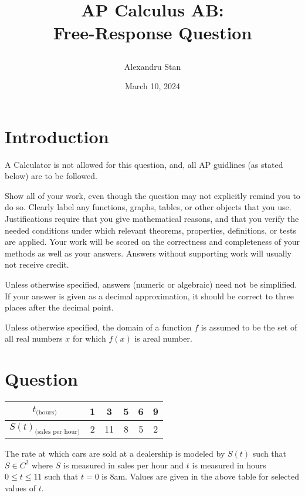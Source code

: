 \documentclass{article}
\title{
    \textbf{AP Calculus AB: \\Free-Response Question}
    \author{Alexandru Stan}
    \date{March 10, 2024}
}
\begin{document}
    \maketitle
    \vfill
    \newpage

    \section*{Introduction}

    A Calculator is not allowed for this question, and, all AP guidlines (as stated below) 
    are to be followed. 

    Show all of your work, even though the question may not explicitly remind you to do so. Clearly label any
    functions, graphs, tables, or other objects that you use. Justifications require that you give mathematical reasons,
    and that you verify the needed conditions under which relevant theorems, properties, definitions, or tests are
    applied. Your work will be scored on the correctness and completeness of your methods as well as your answers.
    Answers without supporting work will usually not receive credit.

    Unless otherwise specified, answers (numeric or algebraic) need not be simplified. If your answer is given as a
    decimal approximation, it should be correct to three places after the decimal point.

    Unless otherwise specified, the domain of a function $f$ is assumed to be the set of all real numbers $x$ for which
    $f(x)$ is areal number.

    \section*{Question}

    \begin{table}[h]
        \def\arraystretch{2}
        \begin{tabular}{|c|c|c|c|c|c|}
            \hline
            $t_{\text{(hours)}}$ & 1 & 3 & 5 & 6 & 9 \\
            \hline
            $S(t)_{\text{(sales per hour)}}$ & 2 & 11 & 8 & 5 & 2 \\
            \hline 
        \end{tabular}
    \end{table} 

    The rate at which cars are sold at a dealership is modeled by $S(t)$ such that $S \in C^2$ 
    where  $S$ is measured in sales per hour and $t$ is measured in hours $0 \le t \le 11$ such that
    $t = 0$ is 8am. Values are given in the above table for selected values of $t$.
\end{document}
